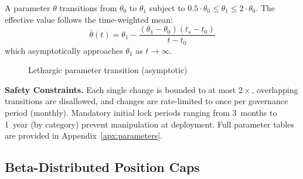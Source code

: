 \documentclass[10pt,a4paper,twocolumn]{article}
\begin{document}
\begin{definition}
\label{def:param-transition}
A parameter $\theta$ transitions from $\theta_0$ to $\theta_1$ subject to $0.5 \cdot \theta_0 \leq \theta_1 \leq 2 \cdot \theta_0$. The effective value follows the time-weighted mean:
\begin{equation}
\bar{\theta}(t) = \theta_1 - \frac{(\theta_1 - \theta_0)(t_s - t_0)}{t - t_0}
\end{equation}
which asymptotically approaches $\theta_1$ as $t \to \infty$.
\end{definition}

\begin{figure}[htbp]
\centering
{}
\caption{Lethargic parameter transition (asymptotic)}
\label{fig:lethargic-transition}
\end{figure}

\textbf{Safety Constraints.} Each single change is bounded to at most $2\times$, overlapping transitions are disallowed, and changes are rate-limited to once per governance period (monthly). Mandatory initial lock periods ranging from 3~months to 1~year (by category) prevent manipulation at deployment. Full parameter tables are provided in Appendix~\ref{apx:parameters}.

\subsection{Beta-Distributed Position Caps}
\label{subsec:beta-caps}
\end{document}
